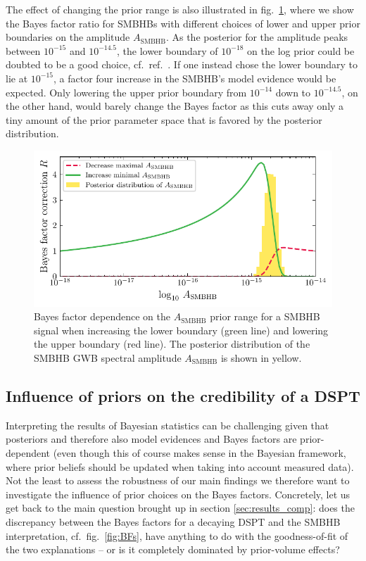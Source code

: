 	The effect of changing the prior range is also illustrated in fig.~\ref{fig:priordependence}, where we show the Bayes factor ratio for \acp{SMBHB} with different choices of lower and upper prior boundaries on the amplitude $A_\text{SMBHB}$. As the posterior for the amplitude peaks between $10^{-15}$ and $10^{-14.5}$, the lower boundary of $10^{-18}$ on the  log prior could be doubted to be a good choice, cf.~ref.~\cite{Casey-Clyde:2021xro}. If one instead chose the lower boundary to lie at $10^{-15}$, a factor four increase in the \ac{SMBHB}'s model evidence would be expected. Only lowering the upper prior boundary from $10^{-14}$ down to $10^{-14.5}$, on the other hand, would barely change the Bayes factor as this cuts away  only a tiny amount of the prior parameter space that is favored by the posterior distribution.
	\begin{figure}[t]
		\centering
		\includegraphics[width=\linewidth]{thesisplots/ptbbn/ptbbn_7}
		\caption{Bayes factor dependence on the $A_\text{SMBHB}$ prior range for a SMBHB signal when increasing the lower boundary (\textcolor{PlotGreen}{green} line) and lowering the upper boundary (\textcolor{PlotRed}{red} line). The posterior distribution of the \ac{SMBHB} \ac{GWB} spectral amplitude $A_\text{SMBHB}$ is shown in \textcolor{PlotYellow}{yellow}.}
		\label{fig:priordependence}
	\end{figure}
	
	
	\subsection{Influence of priors on the credibility of a DSPT}
	\label{sec:priorsDSPT}
	
	Interpreting the results of Bayesian statistics can be challenging given that posteriors and therefore also model evidences and Bayes factors are prior-dependent (even though this of course makes sense in the Bayesian framework, where prior beliefs should be updated when taking into account measured data). Not the least to assess the robustness of our main findings we therefore want to investigate the influence of prior choices on the Bayes factors. Concretely, let us get back to the main question brought up in section \ref{sec:results_comp}: does the discrepancy between the Bayes factors for a decaying \ac{DSPT} and the \ac{SMBHB} interpretation, cf.~fig.~\ref{fig:BFs}, have anything to do with the goodness-of-fit of the two explanations -- or is it completely dominated by prior-volume effects?
	
